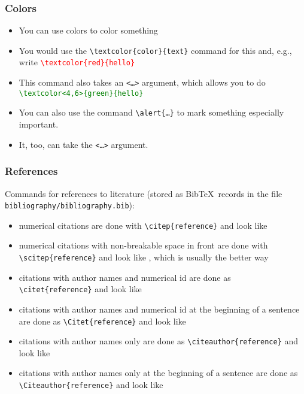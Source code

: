 \documentclass[mathserif]{beamer}%
\begin{document}
\begin{frame}%
\frametitle{Colors}%
\begin{itemize}%
\item You can use colors to color something%
\item<2-> You would use the \texttt{{\textbackslash}textcolor\{color\}\{text\}} command for this and, e.g., write \textcolor{red}{\texttt{{\textbackslash}textcolor\{red\}\{hello\}}}%
\item<3-> This command also takes an \texttt{<\dots>} argument, which allows you to do \textcolor<4,6>{green}{\texttt{{\textbackslash}textcolor<4,6>\{green\}\{hello\}}}%
\item<7-> You can also use the command \texttt{{\textbackslash}alert\{\dots\}} to mark \alert{something especially important}.%
\item<8-> It, too, can take the \texttt{<\dots>} argument.%
\end{itemize}%
\end{frame}%
%
\begin{frame}%
\frametitle{References}%
Commands for references to literature (stored as Bib\TeX\ records in the file \texttt{bibliography/bibliography.bib}):%
\begin{itemize}%
\item\small numerical citations are done with \texttt{{\textbackslash}citep\{reference\}} and look like %
\item\small numerical citations with non-breakable space in front are done with \texttt{{\textbackslash}scitep\{reference\}} and look like , which is usually the better way%
\item\small citations with author names and numerical id are done as \texttt{{\textbackslash}citet\{reference\}} and look like %
\item\small citations with author names and numerical id at the beginning of a sentence are done as \texttt{{\textbackslash}Citet\{reference\}} and look like %
\item\small citations with author names only are done as \texttt{{\textbackslash}citeauthor\{reference\}} and look like %
\item\small citations with author names only at the beginning of a sentence are done as \texttt{{\textbackslash}Citeauthor\{reference\}} and look like %
\end{itemize}%
\end{frame}%
\end{document}
